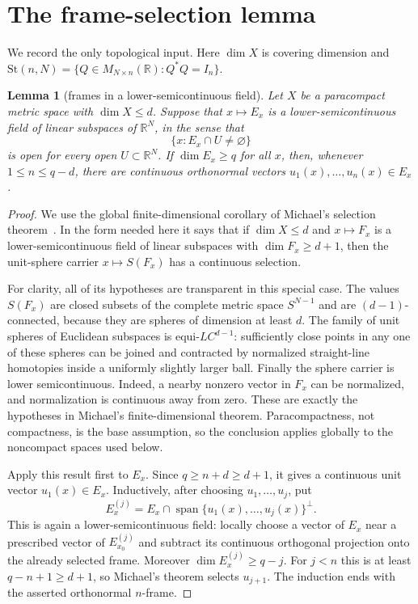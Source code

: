 \documentclass[11pt]{article}
\newtheorem{lemma}[theorem]{Lemma}
\newcommand{\R}{\mathbb R}
\newcommand{\St}{\mathrm{St}}
\begin{document}
\section{The frame-selection lemma}

We record the only topological input.  Here $\dim X$ is covering dimension and
$\St(n,N)=\{Q\in M_{N\times n}(\R):Q^*Q=I_n\}$.

\begin{lemma}[frames in a lower-semicontinuous field]\label{lem:lsc}
Let $X$ be a paracompact metric space with $\dim X\leq d$.  Suppose that
$x\mapsto E_x$ is a lower-semicontinuous field of linear subspaces of
$\R^N$, in the sense that
\[
 \{x:E_x\cap U\ne\varnothing\}
\]
is open for every open $U\subset\R^N$.  If $\dim E_x\geq q$ for all $x$,
then, whenever $1\leq n\leq q-d$, there are continuous orthonormal vectors
$u_1(x),\ldots,u_n(x)\in E_x$.
\end{lemma}

\begin{proof}
We use the global finite-dimensional corollary of Michael's selection
theorem~\cite[Theorem 1.2]{Michael}.  In the form needed here it says that if
$\dim X\leq d$ and $x\mapsto F_x$ is a lower-semicontinuous field of linear
subspaces with $\dim F_x\geq d+1$, then the unit-sphere carrier
$x\mapsto S(F_x)$ has a continuous selection.

For clarity, all of its hypotheses are transparent in this special case.
The values $S(F_x)$ are closed subsets of the complete metric space
$S^{N-1}$ and are $(d-1)$-connected, because they are spheres of dimension
at least $d$.  The family of unit spheres of Euclidean subspaces is
equi-$LC^{d-1}$: sufficiently close points in any one of these spheres can
be joined and contracted by normalized straight-line homotopies inside a
uniformly slightly larger ball.  Finally the sphere carrier is lower
semicontinuous.  Indeed, a nearby nonzero vector in $F_x$ can be normalized,
and normalization is continuous away from zero.  These are exactly the
hypotheses in Michael's finite-dimensional theorem.  Paracompactness, not
compactness, is the base assumption, so the conclusion applies globally to
the noncompact spaces used below.

Apply this result first to $E_x$.  Since $q\geq n+d\geq d+1$, it gives a
continuous unit vector $u_1(x)\in E_x$.  Inductively, after choosing
$u_1,\ldots,u_j$, put
\[
 E_x^{(j)}=E_x\cap\operatorname{span}\{u_1(x),\ldots,u_j(x)\}^{\perp}.
\]
This is again a lower-semicontinuous field: locally choose a vector of $E_x$
near a prescribed vector of $E_{x_0}^{(j)}$ and subtract its continuous
orthogonal projection onto the already selected frame.  Moreover
$\dim E_x^{(j)}\geq q-j$.  For $j<n$ this is at least
$q-n+1\geq d+1$, so Michael's theorem selects $u_{j+1}$.  The induction ends
with the asserted orthonormal $n$-frame.
\end{proof}
\end{document}
